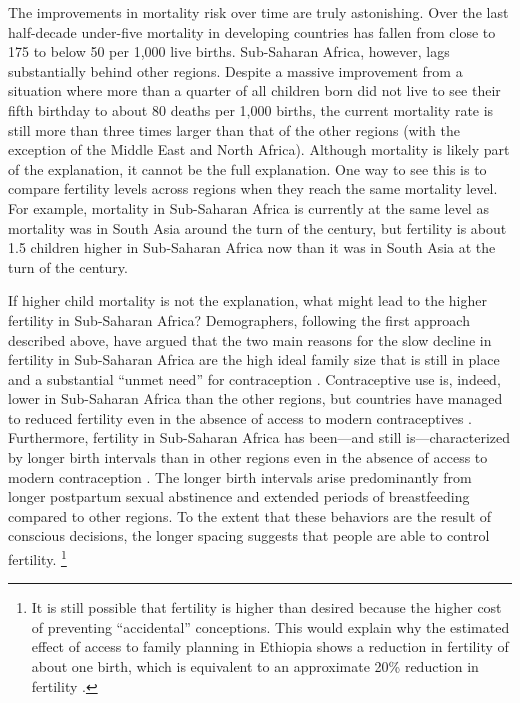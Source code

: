 \documentclass[letterpaper,12pt]{article}
\begin{document}
The improvements in mortality risk over time are truly astonishing.
Over the last half-decade under-five mortality in developing countries has
fallen from close to 175 to below 50 per 1,000 live births.
Sub-Saharan Africa, however, lags substantially behind other regions.
Despite a massive improvement from a situation where more than a quarter
of all children born did not live to see their fifth birthday to about
80 deaths per 1,000 births, the current mortality rate is still more
than three times larger than that of the other regions (with the
exception of the Middle East and North Africa).
Although mortality is likely part of the explanation, it cannot be the
full explanation.
One way to see this is to compare fertility levels across regions when
they reach the same mortality level.
For example, mortality in Sub-Saharan Africa is currently at the same level 
as mortality was in South Asia around the turn of the century, but fertility 
is about 1.5 children higher in Sub-Saharan Africa now than it was in South 
Asia at the turn of the century.

If higher child mortality is not the explanation, what might lead to the
higher fertility in Sub-Saharan Africa? 
Demographers, following the first approach described above, have argued 
that the two main reasons for the slow decline in fertility in Sub-Saharan 
Africa are the high ideal family size that is still in place and a 
substantial ``unmet need'' for contraception 
\citep{Bongaarts2013a,Casterline2017,Singh2017}.
Contraceptive use is, indeed, lower in Sub-Saharan Africa than the other
regions, but countries have managed to reduced fertility even in the
absence of access to modern contraceptives
\citet{Schultz1985,Galloway1987,Bailey1998,bengtsson06}.
Furthermore, fertility in Sub-Saharan Africa has been---and still 
is---characterized by longer birth intervals than in other regions even
in the absence of access to modern contraception 
\citep{Caldwell1992,Moultrie2012,Casterline2016}.
The longer birth intervals arise predominantly from longer postpartum 
sexual abstinence and extended periods of breastfeeding compared to 
other regions.
To the extent that these behaviors are the result of conscious decisions, 
the longer spacing suggests that people are able to control fertility.%
\footnote{
It is still possible that fertility is higher than desired because the
higher cost of preventing ``accidental'' conceptions.
This would explain why the estimated effect of access to family planning
in Ethiopia shows a reduction in fertility of about one birth, which is
equivalent to an approximate 20\% reduction in fertility
\citep{Portner2014a}.}
\end{document}
